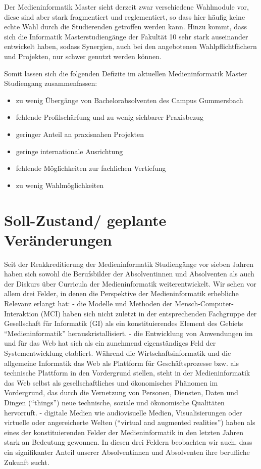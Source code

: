 Der Medieninformatik Master sieht derzeit zwar verschiedene Wahlmodule
vor, diese sind aber stark fragmentiert und reglementiert, so dass hier
häufig keine echte Wahl durch die Studierenden getroffen werden kann.
Hinzu kommt, dass sich die Informatik Masterstudiengänge der Fakultät 10
sehr stark auseinander entwickelt haben, sodass Synergien, auch bei den
angebotenen Wahlpflichtfächern und Projekten, nur schwer genutzt werden
können.

Somit lassen sich die folgenden Defizite im aktuellen Medieninformatik
Master Studiengang zusammenfassen:

\begin{itemize}
\tightlist
\item
  zu wenig Übergänge von Bachelorabsolventen des Campus Gummersbach
\item
  fehlende Profilschärfung und zu wenig sichbarer Praxisbezug
\item
  geringer Anteil an praxisnahen Projekten
\item
  geringe internationale Ausrichtung
\item
  fehlende Möglichkeiten zur fachlichen Vertiefung
\item
  zu wenig Wahlmöglichkeiten
\end{itemize}

\chapter{Soll-Zustand/ geplante
Veränderungen}\label{soll-zustand-geplante-veruxe4nderungen}

Seit der Reakkreditierung der Medieninformatik Studiengänge vor sieben
Jahren haben sich sowohl die Berufsbilder der Absolventinnen und
Absolventen als auch der Diskurs über Curricula der Medieninformatik
weiterentwickelt. Wir sehen vor allem drei Felder, in denen die
Perspektive der Medieninformatik erhebliche Relevanz erlangt hat: - die
Modelle und Methoden der Mensch-Computer-Interaktion (MCI) haben sich
nicht zuletzt in der entsprechenden Fachgruppe der Gesellschaft für
Informatik (GI) als ein konstituierendes Element des Gebiets
``Medieninformatik'' herauskristallisiert. - die Entwicklung von
Anwendungen im und für das Web hat sich als ein zunehmend eigenständiges
Feld der Systementwicklung etabliert. Während die Wirtschaftsinformatik
und die allgemeine Informatik das Web als Plattform für
Geschäftsprozesse bzw. als technische Plattform in den Vordergrund
stellen, steht in der Medieninformatik das Web selbst als
gesellschaftliches und ökonomisches Phänomen im Vordergrund, das durch
die Vernetzung von Personen, Diensten, Daten und Dingen (``things'')
neue technische, soziale und ökonomische Qualitäten hervorruft. -
digitale Medien wie audiovisuelle Medien, Visualisierungen oder
virtuelle oder angereicherte Welten (``virtual and augmented
realities'') haben als eines der konstituierenden Felder der
Medieninformatik in den letzten Jahren stark an Bedeutung gewonnen. In
diesen drei Feldern beobachten wir auch, dass ein signifikanter Anteil
unserer Absolventinnen und Absolventen ihre berufliche Zukunft sucht.

